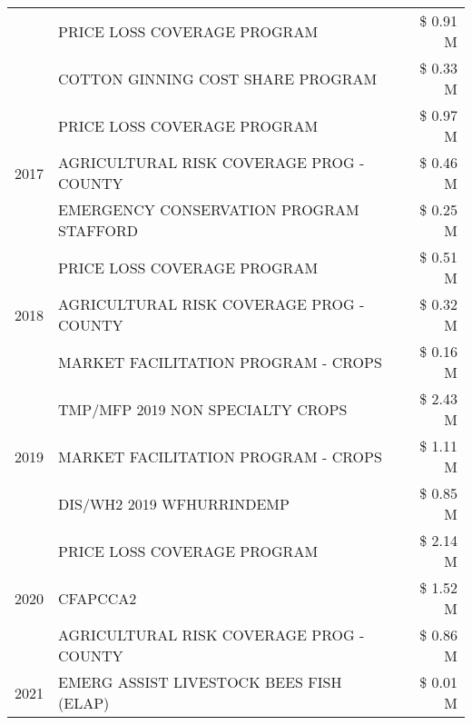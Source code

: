 \begin{tabular}{llr}
 & PRICE LOSS COVERAGE PROGRAM & \$ 0.91 M \\
 & COTTON GINNING COST SHARE PROGRAM & \$ 0.33 M \\
\cline{1-3}
\multirow[t]{3}{*}{2017} & PRICE LOSS COVERAGE PROGRAM & \$ 0.97 M \\
 & AGRICULTURAL RISK COVERAGE PROG - COUNTY & \$ 0.46 M \\
 & EMERGENCY CONSERVATION PROGRAM STAFFORD & \$ 0.25 M \\
\cline{1-3}
\multirow[t]{3}{*}{2018} & PRICE LOSS COVERAGE PROGRAM & \$ 0.51 M \\
 & AGRICULTURAL RISK COVERAGE PROG - COUNTY & \$ 0.32 M \\
 & MARKET FACILITATION PROGRAM - CROPS & \$ 0.16 M \\
\cline{1-3}
\multirow[t]{3}{*}{2019} & TMP/MFP 2019 NON SPECIALTY CROPS & \$ 2.43 M \\
 & MARKET FACILITATION PROGRAM - CROPS & \$ 1.11 M \\
 & DIS/WH2 2019 WFHURRINDEMP & \$ 0.85 M \\
\cline{1-3}
\multirow[t]{3}{*}{2020} & PRICE LOSS COVERAGE PROGRAM & \$ 2.14 M \\
 & CFAPCCA2 & \$ 1.52 M \\
 & AGRICULTURAL RISK COVERAGE PROG - COUNTY & \$ 0.86 M \\
\cline{1-3}
2021 & EMERG ASSIST LIVESTOCK BEES FISH (ELAP) & \$ 0.01 M \\
\cline{1-3}
\bottomrule
\end{tabular}
